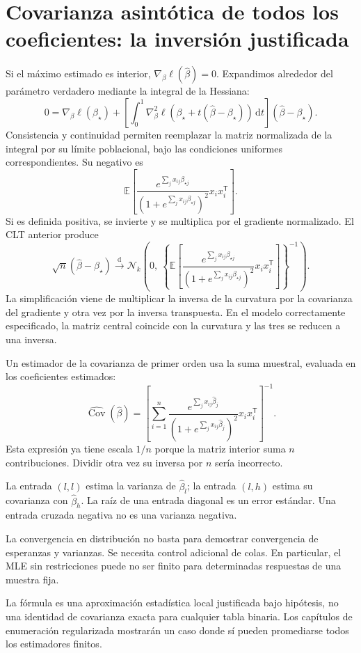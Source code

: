 \documentclass[11pt,a4paper]{article}
\newcommand{\E}{\mathbb E}
\newcommand{\T}{^{\mathsf T}}
\newcommand{\dd}{\,\mathrm d}
\DeclareMathOperator{\Cov}{Cov}
\begin{document}
\clearpage
\section{Covarianza asintótica de todos los coeficientes: la inversión justificada}\label{logit55}
Si el máximo estimado es interior,
$\nabla_\beta\ell(\widehat\beta)=0$.
Expandimos alrededor del parámetro verdadero mediante la integral
de la Hessiana:
\[
0=\nabla_\beta\ell(\beta_\star)
+\left[\int_0^1\nabla_\beta^2\ell(
\beta_\star+t(\widehat\beta-\beta_\star))\dd t\right]
(\widehat\beta-\beta_\star).
\]
Consistencia y continuidad permiten reemplazar la matriz
normalizada de la integral por su límite poblacional, bajo
las condiciones uniformes correspondientes.
Su negativo es
\[
\E\!\left[
\frac{e^{\sum_jx_{ij}\beta_{\star j}}}
{(1+e^{\sum_jx_{ij}\beta_{\star j}})^2}x_ix_i\T
\right].
\]
Si es definida positiva, se invierte y se multiplica por el
gradiente normalizado. El CLT anterior produce
\[
\boxed{
\sqrt n(\widehat\beta-\beta_\star)
\xrightarrow{\mathrm d}
\mathcal N_k\!\left(
0,\
\left\{\E\!\left[
\frac{e^{\sum_jx_{ij}\beta_{\star j}}}
{(1+e^{\sum_jx_{ij}\beta_{\star j}})^2}x_ix_i\T
\right]\right\}^{-1}
\right)}.
\]
La simplificación viene de multiplicar
la inversa de la curvatura por la covarianza del gradiente
y otra vez por la inversa transpuesta.
En el modelo correctamente especificado, la matriz central
coincide con la curvatura y las tres se reducen a una inversa.

Un estimador de la covarianza de primer orden usa la suma
muestral, evaluada en los coeficientes estimados:
\[
\widehat{\Cov}(\widehat\beta)
=
\left[
\sum_{i=1}^n
\frac{e^{\sum_jx_{ij}\widehat\beta_j}}
{(1+e^{\sum_jx_{ij}\widehat\beta_j})^2}x_ix_i\T
\right]^{-1}.
\]
Esta expresión ya tiene escala $1/n$ porque la matriz interior
suma $n$ contribuciones. Dividir otra vez su inversa por $n$
sería incorrecto.

La entrada $(l,l)$ estima la varianza de $\widehat\beta_l$;
la entrada $(l,h)$ estima su covarianza con $\widehat\beta_h$.
La raíz de una entrada diagonal es un error estándar.
Una entrada cruzada negativa no es una varianza negativa.

\begin{cuidado}
La convergencia en distribución no basta para demostrar
convergencia de esperanzas y varianzas.
Se necesita control adicional de colas.
En particular, el MLE sin restricciones puede no ser finito
para determinadas respuestas de una muestra fija.
\end{cuidado}
La fórmula es una aproximación estadística local justificada
bajo hipótesis, no una identidad de covarianza exacta para
cualquier tabla binaria.
Los capítulos de enumeración regularizada mostrarán un caso
donde sí pueden promediarse todos los estimadores finitos.
\end{document}

